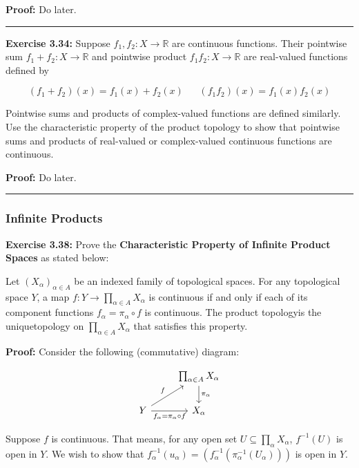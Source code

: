 \documentclass{article}
\begin{document}
\textbf{Proof:} Do later.

\vskip 0.5cm
\hrule
\vskip 0.5cm

\textbf{Exercise 3.34:} Suppose $f_1, f_2 : X \rightarrow \mathbb{R}$ are continuous functions. Their pointwise sum $f_1 + f_2 : X \rightarrow \mathbb{R}$ and pointwise product $f_1 f_2 : X \rightarrow \mathbb{R}$ are real-valued functions defined by 

\[ (f_1 + f_2)(x) = f_1(x) + f_2(x) \;\;\;\;\;\ (f_1 f_2)(x) = f_1(x)f_2(x) \]

Pointwise sums and products of complex-valued functions are defined similarly. Use the characteristic property of the product topology to show that pointwise sums and products of
real-valued or complex-valued continuous functions are continuous.

\vskip 0.5cm

\textbf{Proof:} Do later.

\vskip 0.5cm
\hrule
\vskip 0.5cm

\subsubsection{Infinite Products}

\textbf{Exercise 3.38:} Prove the \textbf{Characteristic Property of Infinite Product Spaces} as stated below:

\vskip 0.5cm
Let $(X_{\alpha})_{\alpha \in A}$ be an indexed family of topological spaces. For any topological space $Y$, a map $f : Y 
\rightarrow \prod_{\alpha \in A} X_{\alpha}$ is continuous if and only if each of its component functions $f_{\alpha} = \pi_{\alpha} \circ f$ is continuous. The product topologyis the uniquetopology on $\prod_{\alpha \in A} X_{\alpha}$ that satisfies this property.

\vskip 0.5cm

\textbf{Proof:} Consider the following (commutative) diagram:

\[\begin{tikzcd}
	& { \prod_{\alpha \in A} X_{\alpha}} \\
	Y & {X_{\alpha}}
	\arrow["f", from=2-1, to=1-2]
	\arrow["{f_{\alpha} = \pi_{\alpha} \circ f}"', from=2-1, to=2-2]
	\arrow["{\pi_{\alpha}}", from=1-2, to=2-2]
\end{tikzcd}\]

\vskip 0.5cm
Suppose $f$ is continuous. That means, for any open set $U \subseteq \prod_{\alpha} X_{\alpha}$, $f^{-1}(U)$ is open in $Y$. We wish to show that $f_{\alpha}^{-1}(u_{\alpha}) = (f_{\alpha}^{-1} ( \pi_{\alpha}^{-1} (U_{\alpha}) ))$ is open in $Y$.
\end{document}
